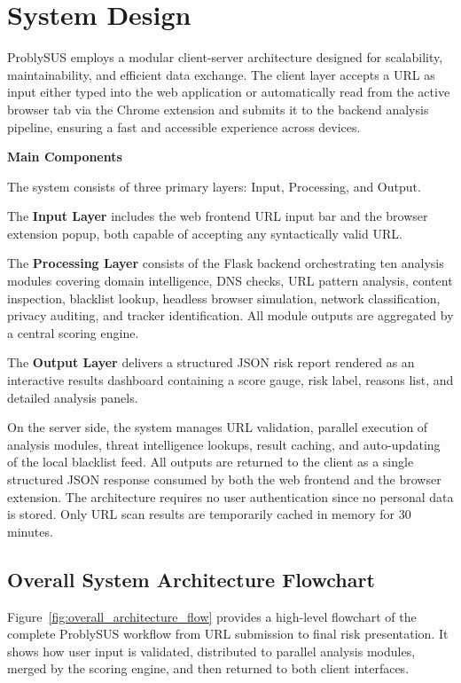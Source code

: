 \chapter{System Design}

ProblySUS employs a modular client-server architecture designed for scalability, maintainability, and efficient data exchange. The client layer accepts a URL as input either typed into the web application or automatically read from the active browser tab via the Chrome extension and submits it to the backend analysis pipeline, ensuring a fast and accessible experience across devices.

\textbf{Main Components}

The system consists of three primary layers: Input, Processing, and Output.

The \textbf{Input Layer} includes the web frontend URL input bar and the browser extension popup, both capable of accepting any syntactically valid URL.

The \textbf{Processing Layer} consists of the Flask backend orchestrating ten analysis modules covering domain intelligence, DNS checks, URL pattern analysis, content inspection, blacklist lookup, headless browser simulation, network classification, privacy auditing, and tracker identification. All module outputs are aggregated by a central scoring engine.

The \textbf{Output Layer} delivers a structured JSON risk report rendered as an interactive results dashboard containing a score gauge, risk label, reasons list, and detailed analysis panels.

On the server side, the system manages URL validation, parallel execution of analysis modules, threat intelligence lookups, result caching, and auto-updating of the local blacklist feed. All outputs are returned to the client as a single structured JSON response consumed by both the web frontend and the browser extension. The architecture requires no user authentication since no personal data is stored. Only URL scan results are temporarily cached in memory for 30 minutes.

\section{Overall System Architecture Flowchart}

Figure~\ref{fig:overall_architecture_flow} provides a high-level flowchart of the complete ProblySUS workflow from URL submission to final risk presentation. It shows how user input is validated, distributed to parallel analysis modules, merged by the scoring engine, and then returned to both client interfaces.

